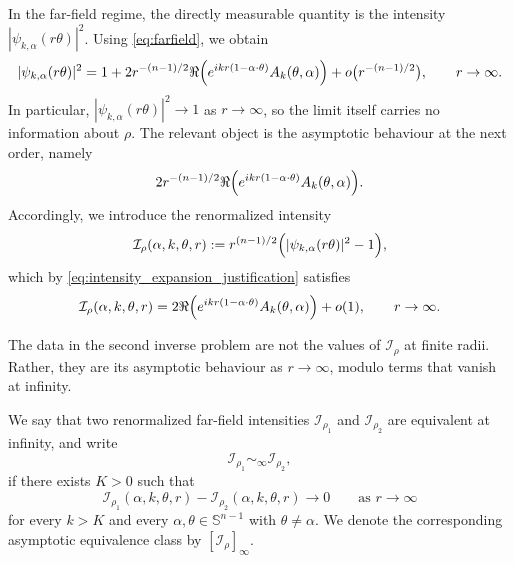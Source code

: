 \documentclass[12pt,a4paper]{amsart}
\numberwithin{equation}{section}
\theoremstyle{plain}
\theoremstyle{definition}
\begin{document}
In the far-field regime, the directly measurable quantity is the intensity $|\psi_{k,\alpha}(r\theta)|^2$. Using \eqref{eq:farfield}, we obtain
\begin{equation}\label{eq:intensity_expansion_justification}
    |\psi_{k,\alpha}(r\theta)|^2
=
1
+
2r^{-(n-1)/2}
\Re\Bigl(
e^{ikr(1-\alpha\cdot\theta)}A_k(\theta,\alpha)
\Bigr)
+
o\bigl(r^{-(n-1)/2}\bigr),
\qquad r\to\infty.
\end{equation}
In particular, $|\psi_{k,\alpha}(r\theta)|^2 \to 1$ as $r\to\infty$, so the limit itself carries no information about $\rho$. The relevant object is the asymptotic behaviour at the next order, namely
\begin{equation*}
    2r^{-(n-1)/2}
    \Re\Bigl(
        e^{ikr(1-\alpha\cdot\theta)}A_k(\theta,\alpha)
    \Bigr).
\end{equation*}
Accordingly, we introduce the renormalized intensity
\begin{equation}\label{eq:renormalized_intensity}
    \mathcal I_\rho(\alpha,k,\theta,r)
    :=
   r^{(n-1)/2}
    \Bigl(
        |\psi_{k,\alpha}(r\theta)|^2-1
    \Bigr),
\end{equation}
which by \eqref{eq:intensity_expansion_justification} satisfies
\begin{equation}\label{eq:Irho_asymptotics}
    \mathcal I_\rho(\alpha,k,\theta,r)
    =
    2\Re\Bigl(
        e^{ikr(1-\alpha\cdot\theta)}A_k(\theta,\alpha)
    \Bigr)
    +
    o(1),
    \qquad r\to\infty.
\end{equation}

The data in the second inverse problem are not the values of
$\mathcal I_\rho$ at finite radii. Rather, they are its asymptotic behaviour as
$r\to\infty$, modulo terms that vanish at infinity.


We say that two renormalized far-field intensities $\mathcal I_{\rho_1}$ and
$\mathcal I_{\rho_2}$ are equivalent at infinity, and write
\begin{equation*}
\mathcal I_{\rho_1}\sim_\infty \mathcal I_{\rho_2},
\end{equation*}
if there exists $K>0$ such that
\begin{equation}\label{eq:equivalence_relation}
\mathcal I_{\rho_1}(\alpha,k,\theta,r)
-
\mathcal I_{\rho_2}(\alpha,k,\theta,r)
\to 0
\qquad \text{as } r\to\infty
\end{equation}
for every $k>K$ and every $\alpha,\theta\in\mathbb{S}^{n-1}$ with
$\theta\neq\alpha$. We denote the corresponding asymptotic equivalence class by $[\mathcal I_\rho]_\infty$.
\end{document}
